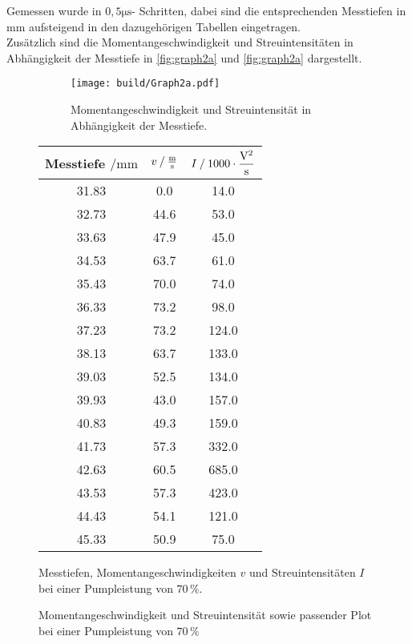 Gemessen wurde in $0,5 \unit{\micro\second}$- Schritten, dabei sind die entsprechenden Messtiefen in $\unit{\milli\meter}$ aufsteigend in den dazugehörigen Tabellen eingetragen. \\

Zusätzlich sind die Momentangeschwindigkeit und Streuintensitäten in Abhängigkeit der Messtiefe in \autoref{fig:graph2a} und \autoref{fig:graph2a} dargestellt.

\begin{figure}[H]
    \begin{subfigure}{0.57\textwidth} 
        \centering
        \texttt{[image: build/Graph2a.pdf]} 
        \caption{Momentangeschwindigkeit und Streuintensität in Abhängigkeit der Messtiefe.}
        \label{fig:graph2a}
        \qquad
    \end{subfigure}
    \begin{subtable}{0.43\textwidth}
        \centering
       \begin{tabular}{c c c}
        \toprule 
        {Messtiefe $\mathbin{/} \unit{\milli\meter}$} & {$v \mathbin{/} \unit{\frac{\meter}{\second}} $} & {$I \mathbin{/} 1000 \cdot \unit{\dfrac{\volt^2}{\second}}$}  \\
        \midrule 
           31.83     &      0.0     &     14.0    \\
           32.73     &     44.6     &     53.0    \\
           33.63     &     47.9     &     45.0    \\
           34.53     &     63.7     &     61.0    \\
           35.43     &     70.0     &     74.0    \\
           36.33     &     73.2     &     98.0    \\
           37.23     &     73.2     &    124.0    \\
           38.13     &     63.7     &    133.0    \\
           39.03     &     52.5     &    134.0    \\
           39.93     &     43.0     &    157.0    \\
           40.83     &     49.3     &    159.0    \\
           41.73     &     57.3     &    332.0    \\
           42.63     &     60.5     &    685.0    \\
           43.53     &     57.3     &    423.0    \\
           44.43     &     54.1     &    121.0    \\
           45.33     &     50.9     &     75.0    \\
        \bottomrule
       \end{tabular}
       \caption{Messtiefen, Momentangeschwindigkeiten $v$ und Streuintensitäten $I$ bei einer Pumpleistung von $70 \,\%$.}
        \label{tab:2a}  
    \end{subtable}
    \caption{Momentangeschwindigkeit und Streuintensität sowie passender Plot bei einer Pumpleistung von $70 \,\%$} 
\end{figure}    


